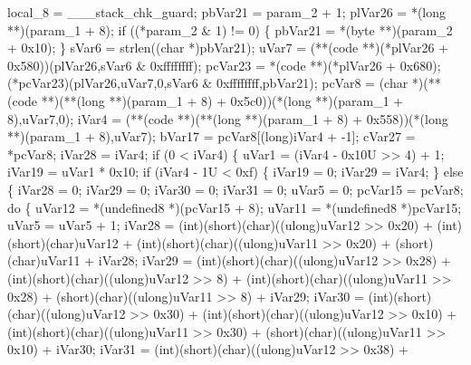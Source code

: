 \documentclass[
]{article}
\newenvironment{Shaded}{}{}
\newcommand{\NormalTok}[1]{#1}
\begin{document}
\begin{Shaded}
\begin{Highlighting}[]
\NormalTok{  local\_8 = \_\_\_stack\_chk\_guard;}
\NormalTok{  pbVar21 = param\_2 + 1;}
\NormalTok{  plVar26 = *(long **)(param\_1 + 8);}
\NormalTok{  if ((*param\_2 \& 1) != 0) \{}
\NormalTok{    pbVar21 = *(byte **)(param\_2 + 0x10);}
\NormalTok{  \}}
\NormalTok{  sVar6 = strlen((char *)pbVar21);}
\NormalTok{  uVar7 = (**(code **)(*plVar26 + 0x580))(plVar26,sVar6 \& 0xffffffff);}
\NormalTok{  pcVar23 = *(code **)(*plVar26 + 0x680);}
\NormalTok{  (*pcVar23)(plVar26,uVar7,0,sVar6 \& 0xffffffff,pbVar21);}
\NormalTok{  pcVar8 = (char *)(**(code **)(**(long **)(param\_1 + 8) + 0x5c0))(*(long **)(param\_1 + 8),uVar7,0);}
\NormalTok{  iVar4 = (**(code **)(**(long **)(param\_1 + 8) + 0x558))(*(long **)(param\_1 + 8),uVar7);}
\NormalTok{  bVar17 = pcVar8[(long)iVar4 + {-}1];}
\NormalTok{  cVar27 = *pcVar8;}
\NormalTok{  iVar28 = iVar4;}
\NormalTok{  if (0 \textless{} iVar4) \{}
\NormalTok{    uVar1 = (iVar4 {-} 0x10U \textgreater{}\textgreater{} 4) + 1;}
\NormalTok{    iVar19 = uVar1 * 0x10;}
\NormalTok{    if (iVar4 {-} 1U \textless{} 0xf) \{}
\NormalTok{      iVar19 = 0;}
\NormalTok{      iVar29 = iVar4;}
\NormalTok{    \}}
\NormalTok{    else \{}
\NormalTok{      iVar28 = 0;}
\NormalTok{      iVar29 = 0;}
\NormalTok{      iVar30 = 0;}
\NormalTok{      iVar31 = 0;}
\NormalTok{      uVar5 = 0;}
\NormalTok{      pcVar15 = pcVar8;}
\NormalTok{      do \{}
\NormalTok{        uVar12 = *(undefined8 *)(pcVar15 + 8);}
\NormalTok{        uVar11 = *(undefined8 *)pcVar15;}
\NormalTok{        uVar5 = uVar5 + 1;}
\NormalTok{        iVar28 = (int)(short)(char)((ulong)uVar12 \textgreater{}\textgreater{} 0x20) +}
\NormalTok{                 (int)(short)(char)uVar12 +}
\NormalTok{                 (int)(short)(char)((ulong)uVar11 \textgreater{}\textgreater{} 0x20) + (short)(char)uVar11 + iVar28;}
\NormalTok{        iVar29 = (int)(short)(char)((ulong)uVar12 \textgreater{}\textgreater{} 0x28) +}
\NormalTok{                 (int)(short)(char)((ulong)uVar12 \textgreater{}\textgreater{} 8) +}
\NormalTok{                 (int)(short)(char)((ulong)uVar11 \textgreater{}\textgreater{} 0x28) +}
\NormalTok{                 (short)(char)((ulong)uVar11 \textgreater{}\textgreater{} 8) + iVar29;}
\NormalTok{        iVar30 = (int)(short)(char)((ulong)uVar12 \textgreater{}\textgreater{} 0x30) +}
\NormalTok{                 (int)(short)(char)((ulong)uVar12 \textgreater{}\textgreater{} 0x10) +}
\NormalTok{                 (int)(short)(char)((ulong)uVar11 \textgreater{}\textgreater{} 0x30) +}
\NormalTok{                 (short)(char)((ulong)uVar11 \textgreater{}\textgreater{} 0x10) + iVar30;}
\NormalTok{        iVar31 = (int)(short)(char)((ulong)uVar12 \textgreater{}\textgreater{} 0x38) +}

\end{Highlighting}
\end{Shaded}
\end{document}

